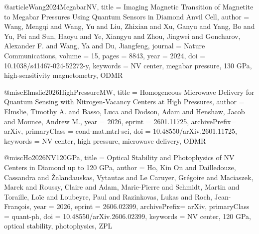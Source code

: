 @article{Wang2024MegabarNV,
  title        = {Imaging Magnetic Transition of Magnetite to Megabar Pressures Using Quantum Sensors in Diamond Anvil Cell},
  author       = {Wang, Mengqi and Wang, Yu and Liu, Zhixian and Xu, Ganyu and Yang, Bo and Yu, Pei and Sun, Haoyu and Ye, Xiangyu and Zhou, Jingwei and Goncharov, Alexander F. and Wang, Ya and Du, Jiangfeng},
  journal      = {Nature Communications},
  volume       = {15},
  pages        = {8843},
  year         = {2024},
  doi          = {10.1038/s41467-024-52272-y},
  keywords     = {NV center, megabar pressure, 130 GPa, high-sensitivity magnetometry, ODMR}
}

@misc{Elmslie2026HighPressureMW,
  title        = {Homogeneous Microwave Delivery for Quantum Sensing with Nitrogen-Vacancy Centers at High Pressures},
  author       = {Elmslie, Timothy A. and Basso, Luca and Dodson, Adam and Henshaw, Jacob and Mounce, Andrew M.},
  year         = {2026},
  eprint       = {2601.11725},
  archivePrefix= {arXiv},
  primaryClass = {cond-mat.mtrl-sci},
  doi          = {10.48550/arXiv.2601.11725},
  keywords     = {NV center, high pressure, microwave delivery, ODMR}
}

@misc{Ho2026NV120GPa,
  title        = {Optical Stability and Photophysics of {NV} Centers in Diamond up to 120 {GPa}},
  author       = {Ho, Kin On and Dailledouze, Cassandra and {\v{Z}}alandauskas, Vytautas and Le Caruyer, Gr{\'e}goire and Maciaszek, Marek and Roussy, Claire and Adam, Marie-Pierre and Schmidt, Martin and Toraille, Lo{\"i}c and Loubeyre, Paul and Razinkovas, Lukas and Roch, Jean-Fran{\c{c}}ois},
  year         = {2026},
  eprint       = {2606.02399},
  archivePrefix= {arXiv},
  primaryClass = {quant-ph},
  doi          = {10.48550/arXiv.2606.02399},
  keywords     = {NV center, 120 GPa, optical stability, photophysics, ZPL}
}
